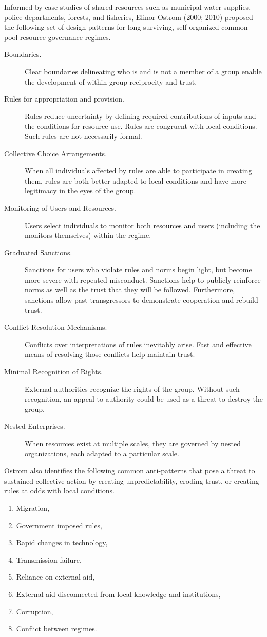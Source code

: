 Informed by case studies of shared resources such as municipal water supplies, police departments, forests, and fisheries, Elinor Ostrom (2000; 2010) proposed the following set of design patterns for long-surviving, self-organized common pool resource governance regimes.
\begin{description}
\item[Boundaries.]{Clear boundaries delineating who is and is not a member of a group enable the development of within-group reciprocity and trust.}
\item[Rules for appropriation and provision.]{Rules reduce uncertainty by defining required contributions of inputs and the conditions for resource use. Rules are congruent with local conditions. Such rules are not necessarily formal.}
\item[Collective Choice Arrangements.]{When all individuals affected by rules are able to participate in creating them, rules are both better adapted to local conditions and have more legitimacy in the eyes of the group.}
\item[Monitoring of Users and Resources.]{Users select individuals to monitor both resources and users (including the monitors themselves) within the regime.}
\item[Graduated Sanctions.]{Sanctions for users who violate rules and norms begin light, but become more severe with repeated misconduct. Sanctions help to publicly reinforce norms as well as the trust that they will be followed. Furthermore, sanctions allow past transgressors to demonstrate cooperation and rebuild trust.}
\item[Conflict Resolution Mechanisms.]{Conflicts over interpretations of rules inevitably arise. Fast and effective means of resolving those conflicts help maintain trust.}
\item[Minimal Recognition of Rights.]{External authorities recognize the rights of the group. Without such recognition, an appeal to authority could be used as a threat to destroy the group.}
\item[Nested Enterprises.]{When resources exist at multiple scales, they are governed by nested organizations, each adapted to a particular scale.}
\end{description}

Ostrom also identifies the following common anti-patterns that pose a threat to sustained collective action by creating unpredictability, eroding trust, or creating rules at odds with local conditions.
\begin{enumerate}
\item{Migration,}
\item{Government imposed rules,}
\item{Rapid changes in technology,}
\item{Transmission failure,}
\item{Reliance on external aid,}
\item{External aid disconnected from local knowledge and institutions,}
\item{Corruption,}
\item{Conflict between regimes.}
\end{enumerate}

